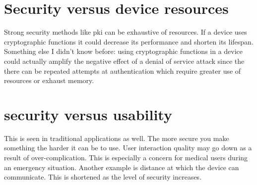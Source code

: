 \documentclass{article}
\begin{document}
\section*{Security versus device resources}
Strong security methods like pki can be exhaustive of resources. If a device uses cryptographic functions it could decrease its performance and shorten its lifespan. Something else I didn't know before: using cryptographic functions in a device could actually amplify the negative effect of a denial of service attack since the there can be repeated attempts at authentication which require greater use of resources or exhaust memory.

\section*{security versus usability}
This is seen in traditional applications as well. The more secure you make something the harder it can be to use. User interaction quality may go down as a result of over-complication. This is especially a concern for medical users during an emergency situation. Another example is distance at which the device can communicate. This is shortened as the level of security increases.
\end{document}
